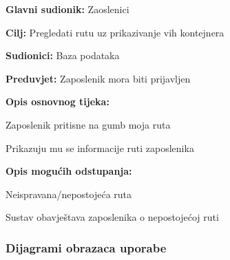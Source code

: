 			\noindent {}
			\begin{packed_item}
				
				\item \textbf{Glavni sudionik:} Zaoslenici
				\item  \textbf{Cilj:} Pregledati rutu uz prikazivanje vih kontejnera
				\item  \textbf{Sudionici:} Baza podataka
				\item  \textbf{Preduvjet:} Zaposlenik mora biti prijavljen
				\item  \textbf{Opis osnovnog tijeka:}
				
				\item[] \begin{packed_enum}
					
					\item Zaposlenik pritisne na gumb moja ruta
					\item Prikazuju mu se informacije ruti zaposlenika
					
				\end{packed_enum}
				
				\item  \textbf{Opis mogućih odstupanja:}
				
				\item[] \begin{packed_item}
					
					\item[2.a] Neispravana/nepostojeća ruta
					\item[] \begin{packed_enum}
						
						\item Sustav obavještava zaposlenika o nepostojećoj ruti

					\end{packed_enum}
					
				\end{packed_item}
			\end{packed_item}
			
			\subsubsection{Dijagrami obrazaca uporabe}
            
